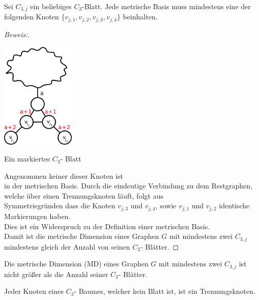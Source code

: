 \begin{lem}
Sei $C_{3,j}$ ein beliebiges $C_{3}$-Blatt. Jede metrische Basis muss mindestens eine der folgenden Knoten $\{v_{j,1},v_{j,2},v_{j,3},v_{j,4}\}$ beinhalten.
\end{lem}
\begin{proof}[Beweis:]~
\par
\vspace{-2mm}
\begin{floatingfigure}[l]{200pt}
{\flushleft
\hspace*{1.7cm}
\includegraphics[width=100pt]{bilder/beweis.pdf}}
\caption{Ein markiertes $C_{3}$- Blatt}
\end{floatingfigure}
Angenommen keiner dieser Knoten ist\\in der metrischen Basis. Durch die eindeutige Verbindung zu dem Restgraphen, welche über einen Trennungsknoten läuft, folgt aus\\Symmetriegründen dass die Knoten $v_{j,3}$ und $v_{j,4}$, sowie $v_{j,1}$ und $v_{j,2}$ identische Markierungen haben.\\Dies ist ein Widerspruch zu der Definition einer metrischen Basis.\\
Damit ist die metrische Dimension eines Graphen $G$ mit mindestens zwei $C_{3,j}$\\mindestens gleich der Anzahl von seinen $C_{3}$- Blätter.
\end{proof}
\par
\vspace{+3mm}
\begin{lem}
Die metrische Dimension (MD) eines Graphen $G$ mit mindestens zwei $C_{3,j}$ ist nicht größer als die Anzahl seiner $C_{3}$- Blätter. 
\end{lem}
\begin{lem}
\label{bkb}
Jeder Knoten eines $C_{3}$- Baumes, welcher kein Blatt ist, ist ein Trennungsknoten.
\end{lem}


